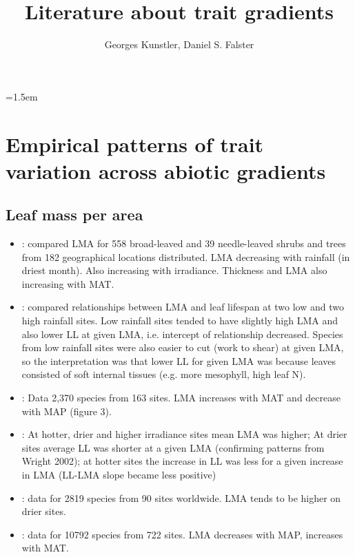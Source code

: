 \documentclass[a4paper,11pt]{article}
\title{Literature about trait gradients}
\author{ Georges Kunstler, Daniel S. Falster}
\date{}
\affiliation{}
\begin{document}
\mstitleshort
\parindent=1.5em
\addtolength{\parskip}{.3em}




\section{Empirical patterns of trait variation across abiotic
gradients}


\subsection{Leaf mass per area}

\begin{itemize}
\item \citet{Niinemets-2001}: compared LMA for 558 broad-leaved and 39 needle-leaved shrubs and trees from 182 geographical locations distributed. LMA decreasing with rainfall (in driest month). Also increasing with irradiance. Thickness and LMA also increasing with MAT.

\item \citet{Wright-2002}: compared relationships between LMA and leaf lifespan at two low and two high rainfall sites. Low rainfall sites tended to have slightly high LMA and also lower LL at given LMA, i.e. intercept of relationship decreased. Species from low rainfall sites were also easier to cut (work to shear) at given LMA, so the interpretation was that lower LL for given LMA was because leaves consisted of soft internal tissues (e.g. more mesophyll, high leaf N).

\item \citet{Wright-2004}: Data 2,370 species from 163 sites. LMA increases with MAT and decrease with MAP (figure 3).

\item \citet{Wright-2005}: At hotter, drier and higher irradiance sites mean LMA was higher; At drier sites average LL was shorter at a given LMA (confirming patterns from Wright 2002); at hotter sites the increase in LL was less for a given increase in LMA (LL-LMA slope became less positive)

\item \citet{Onoda-2011}: data for 2819 species from 90 sites worldwide. LMA tends to be higher on drier sites.

\item \citet{Moles-2014}: data for 10792 species from 722 sites. LMA decreases with MAP, increases with MAT.


\end{itemize}
\end{document}
